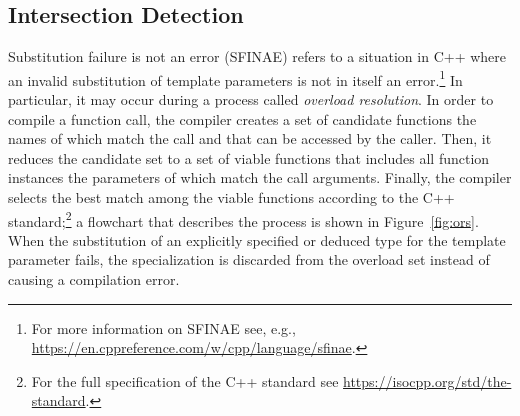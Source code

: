 \subsection{Intersection Detection}
\label{sec:code:intersectionDetection}
Substitution failure is not an error (SFINAE) refers to a situation in
C++ where an invalid substitution of template parameters is not in
itself an error.\footnote{For more information on SFINAE see, e.g.,
\url{https://en.cppreference.com/w/cpp/language/sfinae}.} In 
particular, it may occur during a process called 
\emph{overload resolution}. In order to compile a function call, the
compiler creates a set of candidate functions the names of which match
the call and that can be accessed by the caller. Then, it reduces the
candidate set to a set of viable functions that includes all function
instances the parameters of which match the call arguments. Finally,
the compiler selects the best match among the viable functions
according to the C++ standard;\footnote{For the full specification of
  the C++ standard see \url{https://isocpp.org/std/the-standard}.} a
flowchart that describes the process is shown in
Figure~\ref{fig:ors}. When the substitution of an explicitly specified
or deduced type for the template parameter fails, the specialization
is discarded from the overload set instead of causing a compilation
error.

